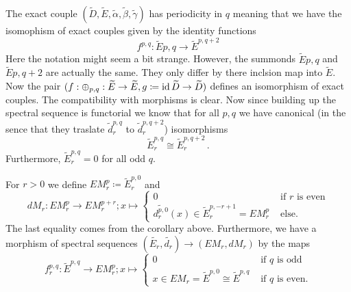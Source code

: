 \begin{corollary}[Periodicity in $q$]
	The exact couple $(\widetilde{D},\widetilde{E},\widetilde{\alpha},\widetilde{\beta},\widetilde{\gamma})$ has periodicity in $q$ meaning that we have the isomophism of exact couples given by the identity functions
	\begin{equation*}
		f^{p,q}:\widetilde{E}{p,q}\to \widetilde{E}^{p,q+2}
	\end{equation*}
	Here the notation might seem a bit strange. However, the summonds $\widetilde{E}{p,q}$ and $\widetilde{E}{p,q+2}$ are actually the same. They only differ by there inclsion map into $\widetilde{E}$. Now the pair $(f:\oplus_{p,q}:\widetilde{E}\to \widetilde{E}, g\coloneq \operatorname{\mathrm{id}} \widetilde{D}\to \widetilde{D})$ defines an isomorphism of exact couples. The compatibility with morphisms is clear. Now since building up the spectral sequence is functorial we know that for all $p,q$ we have canonical (in the sence that they traslate $\widetilde{d}_r^{p,q}$ to $\widetilde{d}_r^{p,q+2}$) isomorphisms
	\begin{equation*}
		\widetilde{E}_r^{p,q}\cong \widetilde{E}_{r}^{p,q+2}\,.
	\end{equation*} Furthermore, $\widetilde{E}_r^{p,q}=0$ for all odd $q$.
\end{corollary}
\begin{definition}
	For $r>0$ we define $EM_r^p\coloneq\widetilde{E}^{p,0}_r$ and
	\begin{equation*}
		dM_r:EM_r^p\to EM_r^{p+r}; x\mapsto
		\begin{cases}
			0&\text{ if $r$ is even}\\
			\widetilde{d_r^{p,0}}(x)\in \widetilde{E}_r^{p,-r+1}=EM_r^p&\text{ else. }
		\end{cases}
	\end{equation*} The last equality comes from the corollary above. Furthermore, we have a morphism of spectral sequences $(\widetilde{E_r},\widetilde{d_r})\to (EM_r,dM_r)$ by the maps
	\begin{equation*}
		f_r^{p,q}:\widetilde{E}^{p,q} \to EM^p_r; x\mapsto
		\begin{cases}
			0 & \text{ if $q$ is odd}\\
			x \in EM_r=\widetilde{E}^{p,0}\cong \widetilde{E}^{p,q} &\text{ if $q$ is even.}
		\end{cases}
	\end{equation*}
\end{definition}


